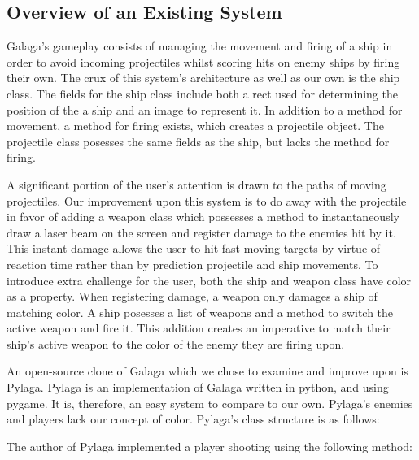 \subsection*{Overview of an Existing System}
Galaga's gameplay consists of managing the movement and firing of a
ship in order to avoid incoming projectiles whilst scoring hits on
enemy ships by firing their own. The crux of this system's
architecture as well as our own is the ship class. The fields for
the ship class include both a rect used for determining the position
of the a ship and an image to represent it. In addition to a method
for movement, a method for firing exists, which creates a projectile
object. The projectile class posesses the same fields as the ship,
but lacks the method for firing.

A significant portion of the user's attention is drawn to the paths
of moving projectiles. Our improvement upon this system is to do
away with the projectile in favor of adding a weapon class which
possesses a method to instantaneously draw a laser beam on the
screen and register damage to the enemies hit by it. This instant
damage allows the user to hit fast-moving targets by virtue of
reaction time rather than by prediction projectile and ship
movements. To introduce extra challenge for the user, both the ship
and weapon class have color as a property. When registering damage,
a weapon only damages a ship of matching color. A ship posesses a
list of weapons and a method to switch the active weapon and fire
it. This addition creates an imperative to match their ship's active
weapon to the color of the enemy they are firing upon.

An open-source clone of Galaga which we chose to examine and improve
upon is \href{https://code.google.com/archive/p/pylaga/source/default/source}{Pylaga}.
Pylaga is an implementation of Galaga written in python, and using
pygame.  It is, therefore, an easy system to compare to our own.
Pylaga's enemies and players lack our concept of color.  Pylaga's
class structure is as follows:


The author of Pylaga implemented a player shooting using the following
method:

